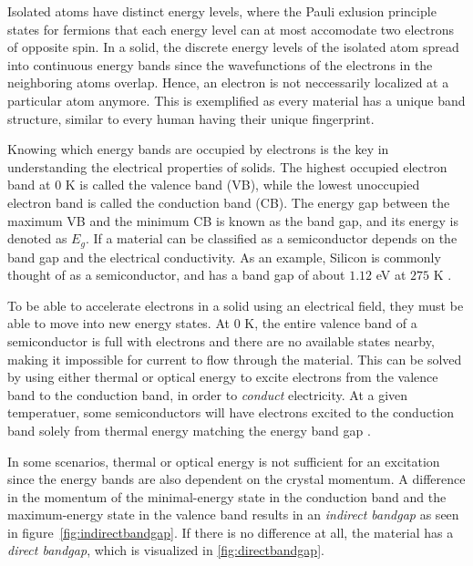 

Isolated atoms have distinct energy levels, where the Pauli exlusion principle \cite{Pauli1925} states for fermions that each energy level can at most accomodate two electrons of opposite spin. In a solid, the discrete energy levels of the isolated atom spread into continuous energy bands since the wavefunctions of the electrons in the neighboring atoms overlap. Hence, an electron is not neccessarily localized at a particular atom anymore. This is exemplified as every material has a unique band structure, similar to every human having their unique fingerprint.

Knowing which energy bands are occupied by electrons is the key in understanding the electrical properties of solids. The highest occupied electron band at $0$ K is called the valence band (VB), while the lowest unoccupied electron band is called the conduction band (CB). The energy gap between the maximum VB and the minimum CB is known as the band gap, and its energy is denoted as $E_g$. If a material can be classified as a semiconductor depends on the band gap and the electrical conductivity. As an example, Silicon is commonly thought of as a semiconductor, and has a band gap of about $1.12$ eV at $275$ K \cite{Martienssen2005}.



To be able to accelerate electrons in a solid using an electrical field, they must be able to move into new energy states. At $0$ K, the entire valence band of a semiconductor is full with electrons and there are no available states nearby, making it impossible for current to flow through the material. This can be solved by using either thermal or optical energy to excite electrons from the valence band to the conduction band, in order to \textit{conduct} electricity. At a given temperatuer, some semiconductors will have electrons excited to the conduction band solely from thermal energy matching the energy band gap \cite{BenStreetman2015}.

In some scenarios, thermal or optical energy is not sufficient for an excitation since the energy bands are also dependent on the crystal momentum. A difference in the momentum of the minimal-energy state in the conduction band and the maximum-energy state in the valence band results in an \textit{indirect bandgap} as seen in figure \autoref{fig:indirectbandgap}. If there is no difference at all, the material has a \textit{direct bandgap}, which is visualized in \autoref{fig:directbandgap}.

